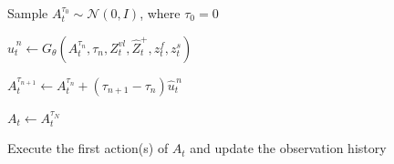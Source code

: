 {\begin{algorithm}[t]
\begin{algorithmic}[1]
    \State Sample $A_t^{\tau_0} \sim \mathcal{N}(0,I)$,
    where $\tau_0=0$


        \State $\widehat{u}_t^{\,n}
        \gets
        G_{\theta}\!\left(
        A_t^{\tau_n},\tau_n,
        Z_t^{vl},\widehat{Z}_t^{+},z_t^f,z_t^s
        \right)$

        \State $A_t^{\tau_{n+1}}
        \gets
        A_t^{\tau_n}
        +
        (\tau_{n+1}-\tau_n)\widehat{u}_t^{\,n}$

    \EndFor

    \State $A_t \gets A_t^{\tau_N}$

    \State Execute the first action(s) of $A_t$
    and update the observation history

\EndFor

\end{algorithmic}
\end{algorithm}%
}